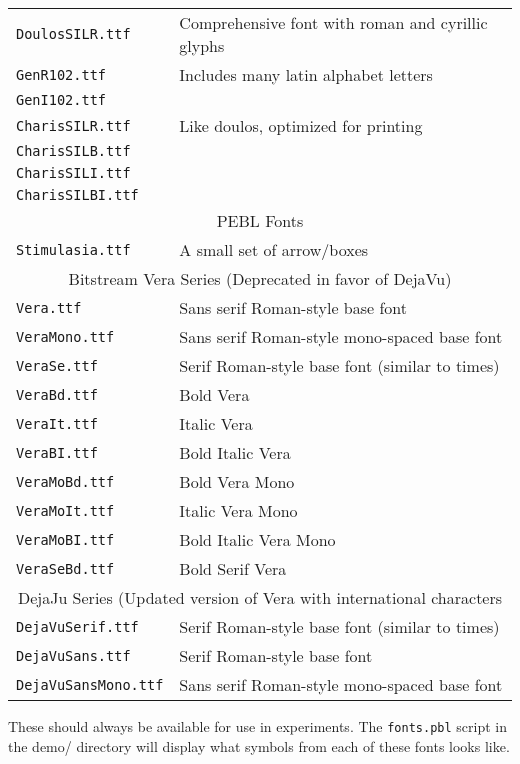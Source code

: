 \begin{table}[htbp]
\begin{tabular}{ll}
\texttt{DoulosSILR.ttf}&Comprehensive font with roman and cyrillic glyphs\\
\texttt{GenR102.ttf}& Includes many latin alphabet letters\\
\texttt{GenI102.ttf}& \\
\texttt{CharisSILR.ttf}& Like doulos, optimized for printing\\
\texttt{CharisSILB.ttf}&\\
\texttt{CharisSILI.ttf}& \\    
\texttt{CharisSILBI.ttf}& \\   
\midrule
\multicolumn{2}{c}{PEBL Fonts}\\
\texttt{Stimulasia.ttf}& A small set of arrow/boxes\\
\midrule
\multicolumn{2}{c}{Bitstream Vera Series (Deprecated in favor of DejaVu)}\\
\texttt{Vera.ttf}    &     Sans serif Roman-style base font\\
\texttt{VeraMono.ttf}&     Sans serif Roman-style mono-spaced base font\\
\texttt{VeraSe.ttf}  &     Serif Roman-style base font (similar to times)\\
\texttt{VeraBd.ttf}  &     Bold Vera\\
\texttt{VeraIt.ttf}  &     Italic Vera\\
\texttt{VeraBI.ttf}  &     Bold Italic Vera\\
\texttt{VeraMoBd.ttf}&     Bold Vera Mono\\
\texttt{VeraMoIt.ttf}&     Italic Vera Mono\\
\texttt{VeraMoBI.ttf}&     Bold Italic Vera Mono\\
\texttt{VeraSeBd.ttf}&     Bold Serif Vera\\
\midrule
\multicolumn{2}{c}{DejaJu Series (Updated version of Vera with
  international characters}\\
\texttt{DejaVuSerif.ttf}    &     Serif Roman-style base font (similar to times)\\
\texttt{DejaVuSans.ttf}     &     Serif Roman-style base font\\
\texttt{DejaVuSansMono.ttf} &   Sans serif Roman-style mono-spaced base font\\

\bottomrule
\end{tabular}
\label{tab:fonts}
\end{table}



These should always be available for use in experiments.  The
\texttt{fonts.pbl} script in the demo/ directory will display what
symbols from each of these fonts looks like.

